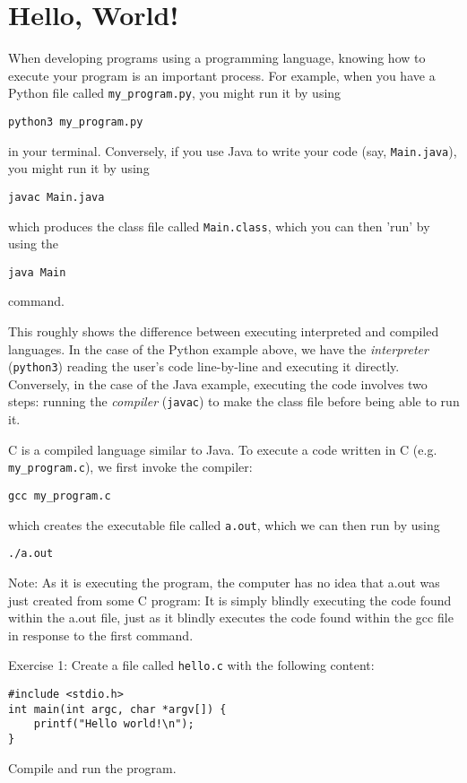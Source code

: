 
\chapter{Hello, World!}
When developing programs using a programming language, knowing how to execute your program is an important process. For example, when you have a Python file called \verb|my_program.py|, you might run it by using 
\begin{verbatim}
python3 my_program.py
\end{verbatim}
in your terminal. Conversely, if you use Java to write your code (say, \verb|Main.java|), you might run it by using
\begin{verbatim}
javac Main.java
\end{verbatim}
which produces the class file called \verb|Main.class|, which you can then 'run' by using the
\begin{verbatim}
java Main
\end{verbatim}
command.

This roughly shows the difference between executing interpreted and compiled languages. In the case of the Python example above, we have the \textit{interpreter} (\verb|python3|) reading the user's code line-by-line and executing it directly. Conversely, in the case of the Java example, executing the code involves two steps: running the \textit{compiler} (\verb|javac|) to make the class file before being able to run it.

C is a compiled language similar to Java. To execute a code written in C (e.g. \verb|my_program.c|), we first invoke the compiler:
\begin{verbatim}
gcc my_program.c
\end{verbatim}
which creates the executable file called \verb|a.out|, which we can then run by using
\begin{verbatim}
./a.out
\end{verbatim}

Note: As it is executing the program, the computer has no idea that a.out was just created from some C program: It is simply blindly executing the code found within the a.out file, just as it blindly executes the code found within the gcc file in response to the first command. %

Exercise 1:
Create a file called \verb|hello.c| with the following content:
\begin{verbatim}
#include <stdio.h>
int main(int argc, char *argv[]) {
    printf("Hello world!\n");
}
\end{verbatim}
Compile and run the program.